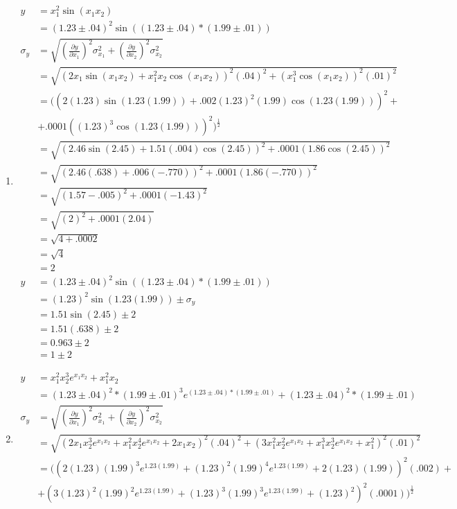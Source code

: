 \documentclass{article}
\begin{document}
\begin{enumerate}
\begin{enumerate}
\item
\begin{align*}
y &= x_1^2\sin(x_1x_2)\\
&= (1.23 \pm .04)^2\sin((1.23 \pm .04) * (1.99 \pm .01))\\
\sigma_{y} &= \sqrt{(\frac{\partial y}{\partial x_1})^2\sigma_{x_1}^2 + (\frac{\partial y}{\partial x_2})^2\sigma_{x_2}^2}\\
&= \sqrt{(2x_1\sin(x_1x_2) + x_1^2x_2\cos(x_1x_2))^2(.04)^2 + (x_1^3\cos(x_1x_2))^2(.01)^2}\\
&= ((2(1.23)\sin(1.23(1.99)) + .002(1.23)^2(1.99)\cos(1.23(1.99)))^2 +\\
&+ .0001((1.23)^3\cos(1.23(1.99)))^2)^\frac12\\
&= \sqrt{(2.46\sin(2.45) + 1.51(.004)\cos(2.45))^2 + .0001(1.86\cos(2.45))^2}\\
&= \sqrt{(2.46(.638) + .006(-.770))^2 + .0001(1.86(-.770))^2}\\
&= \sqrt{(1.57 - .005)^2 + .0001(-1.43)^2}\\
&= \sqrt{(2)^2 + .0001(2.04)}\\
&= \sqrt{4 + .0002}\\
&= \sqrt{4}\\
&= 2\\
y &= (1.23 \pm .04)^2\sin((1.23 \pm .04) * (1.99 \pm .01))\\
&= (1.23)^2\sin(1.23(1.99)) \pm \sigma_{y}\\
&= 1.51\sin(2.45) \pm 2\\
&= 1.51(.638) \pm 2\\
&= 0.963 \pm 2\\
&= 1 \pm 2
\end{align*}
\item
\begin{align*}
y &= x_1^2x_2^3e^{x_1x_2} + x_1^2x_2\\
&= (1.23 \pm .04)^2 * (1.99 \pm .01)^3e^{(1.23 \pm .04) * (1.99 \pm .01)} + (1.23 \pm .04)^2 * (1.99 \pm .01)\\
\sigma_{y} &= \sqrt{(\frac{\partial y}{\partial x_1})^2\sigma_{x_1}^2 + (\frac{\partial y}{\partial x_2})^2\sigma_{x_2}^2}\\
&= \sqrt{(2x_1x_2^3e^{x_1x_2} + x_1^2x_2^4e^{x_1x_2} + 2x_1x_2)^2(.04)^2 + (3x_1^2x_2^2e^{x_1x_2} + x_1^3x_2^3e^{x_1x_2} + x_1^2)^2(.01)^2}\\
&= ((2(1.23)(1.99)^3e^{1.23(1.99)} + (1.23)^2(1.99)^4e^{1.23(1.99)} + 2(1.23)(1.99))^2(.002) +\\
&+ (3(1.23)^2(1.99)^2e^{1.23(1.99)} + (1.23)^3(1.99)^3e^{1.23(1.99)} + (1.23)^2)^2(.0001))^{\frac{1}{2}}\\

\end{align*}
\end{enumerate}
\end{enumerate}
\end{document}
